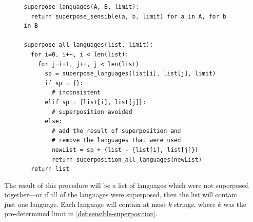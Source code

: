 \documentclass[a4paper,12pt,leqno,twoside]{article}
\begin{document}
\begin{center}
\begin{figure}[h!]
\begin{verbatim}	
superpose_languages(A, B, limit):
  return superpose_sensible(a, b, limit) for a in A, for b in B

superpose_all_languages(list, limit):
  for i=0, i++, i < len(list):
    for j=i+1, j++, j < len(list)
      sp = superpose_languages(list[i], list[j], limit)
      if sp = {}:
        # inconsistent
      elif sp = {list[i], list[j]}:
        # superposition avoided
      else:
        # add the result of superposition and
        # remove the languages that were used
        newList = sp + (list - {list[i], list[j]})
        return superposition_all_languages(newList)
  return list
\end{verbatim}
\end{figure}
\label{fig:pseudo-code-spsens}
\end{center}
The result of this procedure will be a list of languages which were not superposed together---or if all of the languages were superposed, then the list will contain just one language. Each language will contain at most $k$ strings, where $k$ was the pre-determined limit in \cref{def:sensible-superposition}.
\end{document}
